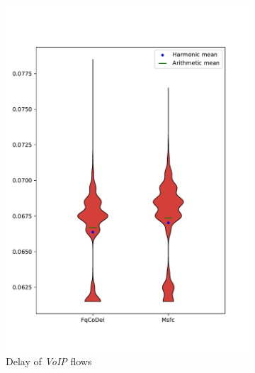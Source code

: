 \begin{figure}
	\centering
	\begin{subfigure}[b]{0.475\textwidth}
		\centering
		\includegraphics[width=\textwidth]{drawings/type1-delay-down_A}
		\caption[]%
		{{\small Delay of \emph{VoIP} flows}}    
		\label{fig:delay_voip}
	\end{subfigure}
	\hfill
	\begin{subfigure}[b]{0.475\textwidth}  
		\centering 

\end{subfigure}
\end{figure}
